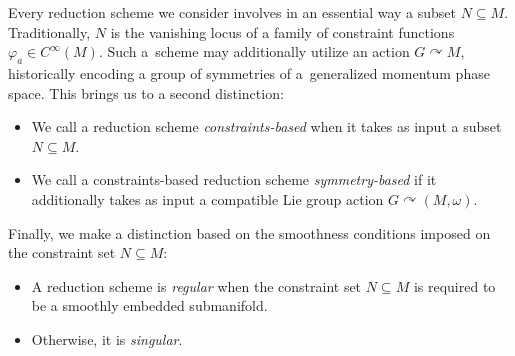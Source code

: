 \documentclass[10pt,a4paper]{amsart}
\numberwithin{equation}{section}
\renewcommand{\subset}{\subseteq}
\begin{document}
Every reduction scheme we consider involves in an essential way a subset $N\subset M$. Traditionally, $N$ is the vanishing locus of a family of constraint functions $\varphi_a \in C^\infty(M)$. Such a~scheme may additionally utilize an action $G\curvearrowright M$, historically encoding a group of symmetries of a~generalized momentum phase space. This brings us to a second distinction:
\begin{itemize}\itemsep=0pt
	\item We call a reduction scheme \emph{constraints-based} when it takes as input a subset $N\subset M$.
	\item We call a constraints-based reduction scheme \emph{symmetry-based} if it additionally takes as input a compatible Lie group action $G\curvearrowright (M,\omega)$.
\end{itemize}

Finally, we make a distinction based on the smoothness conditions imposed on the constraint set $N\subset M$:
\begin{itemize}\itemsep=0pt
	\item A reduction scheme is \emph{regular} when the constraint set $N\subset M$ is required to be a smoothly embedded submanifold.
	\item Otherwise, it is \emph{singular}.
\end{itemize}
\end{document}
